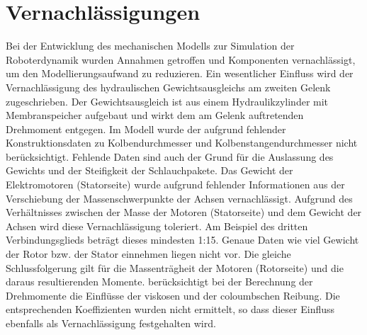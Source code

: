 \section{Vernachlässigungen}
Bei der Entwicklung des mechanischen Modells zur Simulation der Roboterdynamik wurden Annahmen getroffen und Komponenten vernachlässigt, um den Modellierungsaufwand zu reduzieren. Ein wesentlicher Einfluss wird der Vernachlässigung des hydraulischen Gewichtsausgleichs am zweiten Gelenk zugeschrieben. Der Gewichtsausgleich ist aus einem Hydraulikzylinder mit Membranspeicher aufgebaut und wirkt dem am Gelenk auftretenden Drehmoment entgegen. Im Modell wurde der aufgrund fehlender Konstruktionsdaten zu Kolbendurchmesser und Kolbenstangendurchmesser nicht berücksichtigt. Fehlende Daten sind auch der Grund für die Auslassung des Gewichts und der Steifigkeit der Schlauchpakete. Das Gewicht der Elektromotoren (Statorseite) wurde aufgrund fehlender Informationen aus der Verschiebung der Massenschwerpunkte der Achsen vernachlässigt. Aufgrund des Verhältnisses zwischen der Masse der Motoren (Statorseite) und dem Gewicht der Achsen  wird diese Vernachlässigung toleriert. Am Beispiel des dritten Verbindungsglieds beträgt dieses mindesten 1:15. Genaue Daten wie viel Gewicht der Rotor bzw. der Stator einnehmen liegen nicht vor.  Die gleiche Schlussfolgerung gilt für die Massenträgheit der Motoren (Rotorseite) und die daraus resultierenden Momente. \autocite[S.~287~f.]{Grimble.2009} berücksichtigt bei der Berechnung der Drehmomente die Einflüsse der viskosen und der coloumbschen Reibung. Die entsprechenden Koeffizienten wurden nicht ermittelt, so dass dieser Einfluss ebenfalls als Vernachlässigung festgehalten wird. 